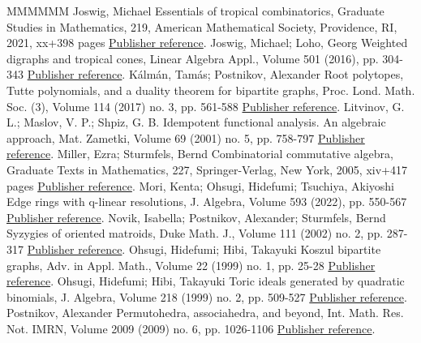 \begin{thebibliography}{MMMMMM}
 Joswig, Michael Essentials of tropical combinatorics, Graduate Studies in Mathematics, 219, American Mathematical Society, Providence, RI, 2021, xx+398 pages \href{https://alco.centre-mersenne.org/articles/10.5802/alco.404/#JoswigBook22}{Publisher reference}.
 Joswig, Michael; Loho, Georg Weighted digraphs and tropical cones, Linear Algebra Appl., Volume 501 (2016), pp. 304-343 \href{https://alco.centre-mersenne.org/articles/10.5802/alco.404/#JoswigLoho:2016}{Publisher reference}.
 Kálmán, Tamás; Postnikov, Alexander Root polytopes, Tutte polynomials, and a duality theorem for bipartite graphs, Proc. Lond. Math. Soc. (3), Volume 114 (2017) no. 3, pp. 561-588 \href{https://alco.centre-mersenne.org/articles/10.5802/alco.404/#KalPos}{Publisher reference}.
 Litvinov, G. L.; Maslov, V. P.; Shpiz, G. B. Idempotent functional analysis. An algebraic approach, Mat. Zametki, Volume 69 (2001) no. 5, pp. 758-797 \href{https://alco.centre-mersenne.org/articles/10.5802/alco.404/#litvinov+maslov+shpiz}{Publisher reference}.
 Miller, Ezra; Sturmfels, Bernd Combinatorial commutative algebra, Graduate Texts in Mathematics, 227, Springer-Verlag, New York, 2005, xiv+417 pages \href{https://alco.centre-mersenne.org/articles/10.5802/alco.404/#MillerSturmfels:2005}{Publisher reference}.
 Mori, Kenta; Ohsugi, Hidefumi; Tsuchiya, Akiyoshi Edge rings with q-linear resolutions, J. Algebra, Volume 593 (2022), pp. 550-567 \href{https://alco.centre-mersenne.org/articles/10.5802/alco.404/#MorOhsTsu}{Publisher reference}.
 Novik, Isabella; Postnikov, Alexander; Sturmfels, Bernd Syzygies of oriented matroids, Duke Math. J., Volume 111 (2002) no. 2, pp. 287-317 \href{https://alco.centre-mersenne.org/articles/10.5802/alco.404/#NPS}{Publisher reference}.
 Ohsugi, Hidefumi; Hibi, Takayuki Koszul bipartite graphs, Adv. in Appl. Math., Volume 22 (1999) no. 1, pp. 25-28 \href{https://alco.centre-mersenne.org/articles/10.5802/alco.404/#ohsugihibikoszul1999}{Publisher reference}.
 Ohsugi, Hidefumi; Hibi, Takayuki Toric ideals generated by quadratic binomials, J. Algebra, Volume 218 (1999) no. 2, pp. 509-527 \href{https://alco.centre-mersenne.org/articles/10.5802/alco.404/#ohsugihibi1999}{Publisher reference}.
 Postnikov, Alexander Permutohedra, associahedra, and beyond, Int. Math. Res. Not. IMRN, Volume 2009 (2009) no. 6, pp. 1026-1106 \href{https://alco.centre-mersenne.org/articles/10.5802/alco.404/#postnikov2009permutohedra}{Publisher reference}.

\end{thebibliography}

